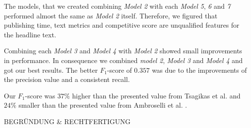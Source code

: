 The models, that we created combining \textit{Model 2} with each \textit{Model 5}, \textit{6} and \textit{7} performed almost the same as \textit{Model 2} itself. Therefore, we figured that publishing time, text metrics and competitive score are unqualified features for the headline text.

Combining each \textit{Model 3} and \textit{Model 4} with \textit{Model 2} showed small improvements in performance. In consequence we combined \textit{model 2}, \textit{Model 3} and \textit{Model 4} and got our best results. The better $F_1$-score of $0.357$ was due to the improvements of the precision value and a consistent recall.

Our $F_1$-score was $37\%$ higher than the presented value from Tsagikas et al. \cite{tsagkias2009predicting} and $24\%$ smaller than the presented value from Ambroselli et al. \cite{ambroselli2018prediction}.

BEGRÜNDUNG \& RECHTFERTIGUNG

